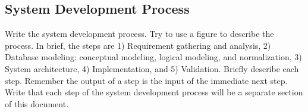 \subsection{System Development Process}\label{subsec:sdp}
Write the system development process. Try to use a figure to describe the process. In brief, the  steps are 1) Requirement gathering and analysis, 2) Database modeling: conceptual modeling, logical modeling, and normalization, 3) System architecture, 4) Implementation, and 5) Validation. Briefly describe each step. Remember the output of a step is the  input of the immediate next step. Write that each step of the system development process will be a separate section of this document.
\begin{comment}


To design a database, one should follow the following steps:
\begin{enumerate}
\item Requirement analysis
	\begin{itemize}
		\item[-] interviewing, documentation, etc .
	\end{itemize}

\item Mapping onto a conceptual model (conceptual design)
     \begin{itemize}
     	\item[-] ER model
     \end{itemize}
\item Mapping onto a data model (logical design)
	\begin{itemize}
     	\item[-] Relational model, object model etc. 
     \end{itemize}
\item Normalization
\item System Architecture
\item Realization and Implementation (physical design)    
    
\end{enumerate}
\end{comment}


